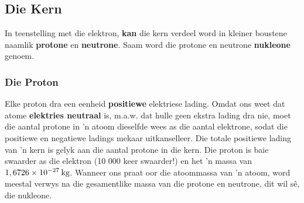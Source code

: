 \subsection*{Die Kern}
\nopagebreak
\label{m38745*id255305}
In teenstelling met die elektron, \textbf{kan} die kern verdeel word in kleiner boustene naamlik \textbf{protone} en \textbf{neutrone}. Saam word die protone en neutrone \textbf{nukleone} genoem.\par 
        
\subsubsection*{Die Proton}
\nopagebreak
\label{m38745*id255338}
Elke proton dra een eenheid \textbf{positiewe} elektriese lading. Omdat ons weet dat atome \textbf{elektries neutraal} is, m.a.w. dat hulle geen ekstra lading dra nie, moet die aantal protone in 'n atoom dieselfde wees as die aantal elektrone, sodat die positiewe en negatiewe ladings mekaar uitkanselleer. Die totale positiewe lading van 'n kern is gelyk aan die aantal protone in die kern. Die proton is baie swaarder as die elektron (10 000 keer swaarder!) en het 'n massa van $1,6726\ensuremath{\times}{10}^{-27}\phantom{\rule{2pt}{0ex}}\text{kg}$. Wanneer ons praat oor die atoommassa van 'n atoom, word meestal verwys na die gesamentlike massa van die protone en neutrone, dit wil s\^{e}, die nukleone. 

        
